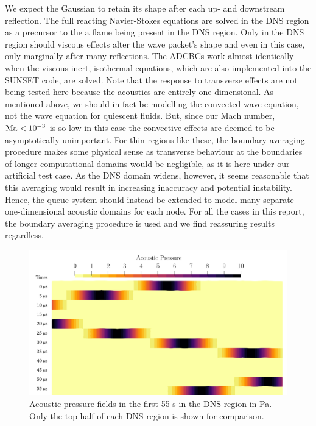 We expect the Gaussian to retain its shape after each up- and downstream reflection. The full reacting Navier-Stokes equations are solved in the DNS region as a precursor to the a flame being present in the DNS region. Only in the DNS region should viscous effects alter the wave packet's shape and even in this case, only marginally after many reflections. The ADCBCs work almost identically when the viscous inert, isothermal equations, which are also implemented into the SUNSET code, are solved. Note that the response to transverse effects are not being tested here because the acoustics are entirely one-dimensional. As mentioned above, we should in fact be modelling the convected wave equation, not the wave equation for quiescent fluids. But, since our Mach number, $\mathrm{Ma} < 10^{-3}$ is so low in this case the convective effects are deemed to be asymptotically unimportant. For thin regions like these, the boundary averaging procedure makes some physical sense as transverse behaviour at the boundaries of longer computational domains would be negligible, as it is here under our artificial test case. As the DNS domain widens, however, it seems reasonable that this averaging would result in increasing inaccuracy and potential instability. Hence, the queue system should instead be extended to model many separate one-dimensional acoustic domains for each node. For all the cases in this report, the boundary averaging procedure is used and we find reassuring results regardless.

\begin{figure}[t]
\centering
\includegraphics[scale=0.30]{assets/graphs/AC_BUMP_first_bounces_comp.png}
\caption{Acoustic pressure fields in the first 55 {\textmu}s in the DNS region in Pa. Only the top half of each DNS region is shown for comparison.}
\label{fig:ac-bump-dns}
\end{figure}


